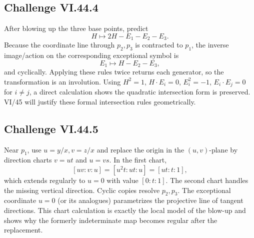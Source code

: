 \subsection*{Challenge VI.44.4}
\begin{solution}
After blowing up the three base points, predict
\[
H\mapsto2H-E_1-E_2-E_3.
\]
Because the coordinate line through \(p_2,p_3\) is contracted to \(p_1\), the inverse image/action on the corresponding exceptional symbol is
\[
E_1\mapsto H-E_2-E_3,
\]
and cyclically.  Applying these rules twice returns each generator, so the transformation is an involution.  Using \(H^2=1\), \(H\cdot E_i=0\), \(E_i^2=-1\), \(E_i\cdot E_j=0\) for \(i\neq j\), a direct calculation shows the quadratic intersection form is preserved.  VI/45 will justify these formal intersection rules geometrically.
\end{solution}

\subsection*{Challenge VI.44.5}
\begin{solution}
Near \(p_1\), use \(u=y/x,v=z/x\) and replace the origin in the \((u,v)\)-plane by direction charts \(v=ut\) and \(u=vs\).  In the first chart,
\[
[uv:v:u]=[u^2t:ut:u]=[ut:t:1],
\]
which extends regularly to \(u=0\) with value \([0:t:1]\).  The second chart handles the missing vertical direction.  Cyclic copies resolve \(p_2,p_3\).  The exceptional coordinate \(u=0\) (or its analogues) parametrizes the projective line of tangent directions.  This chart calculation is exactly the local model of the blow-up and shows why the formerly indeterminate map becomes regular after the replacement.
\end{solution}

